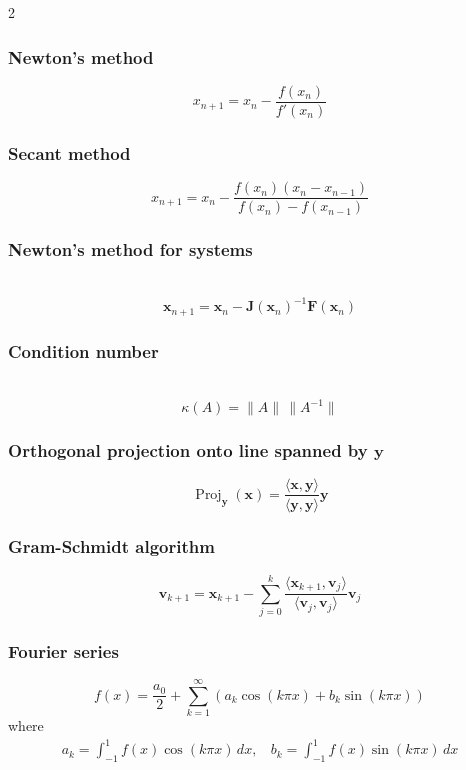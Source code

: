 \documentclass[10pt]{exam}
\newcommand{\on}{\operatorname}
\newcommand{\inner}[1]{\langle {#1} \rangle}
\begin{document}
\begin{multicols}{2}
\subsubsection*{Newton's method}
$$x_{n+1} = x_n - \dfrac{f(x_n)}{f'(x_n)}$$

\subsubsection*{Secant method}
$$x_{n+1} = x_n - \dfrac{f(x_n) (x_n - x_{n-1})}{f(x_n) - f(x_{n-1})}$$


\subsubsection*{Newton's method for systems} ~
$$\mathbf{x}_{n+1} = \mathbf{x}_n - \mathbf{J}(\mathbf{x}_n)^{-1} \mathbf{F}(\mathbf{x}_n)$$

\subsubsection*{Condition number} ~
$$\kappa(A) = \| A \| \, \|A^{-1} \|$$


\subsubsection*{Orthogonal projection onto line spanned by $\mathbf{y}$}

$$\on{Proj}_\mathbf{y}(\mathbf{x}) = \frac{\inner{\mathbf{x}, \mathbf{y}} }{\inner{\mathbf{y}, \mathbf{y}}} \mathbf{y}$$

\subsubsection*{Gram-Schmidt algorithm}

$$\mathbf{v}_{k+1} = \mathbf{x}_{k+1} - \sum_{j = 0}^k \frac{\inner{\mathbf{x}_{k+1}, \mathbf{v}_j}}{\inner{\mathbf{v}_j, \mathbf{v}_j}}\mathbf{v}_j$$

\subsubsection*{Fourier series}

$$f(x) = \frac{a_0}{2} + \sum_{k = 1}^\infty (a_k \cos(k\pi x) + b_k \sin(k \pi x))$$
where 
\begin{align*}
a_k = \int_{-1}^1 f(x) \cos(k\pi x) \, dx,  ~~~~ b_k = \int_{-1}^1 f(x) \sin(k\pi x) \, dx
\end{align*}


\end{multicols}
\end{document}
